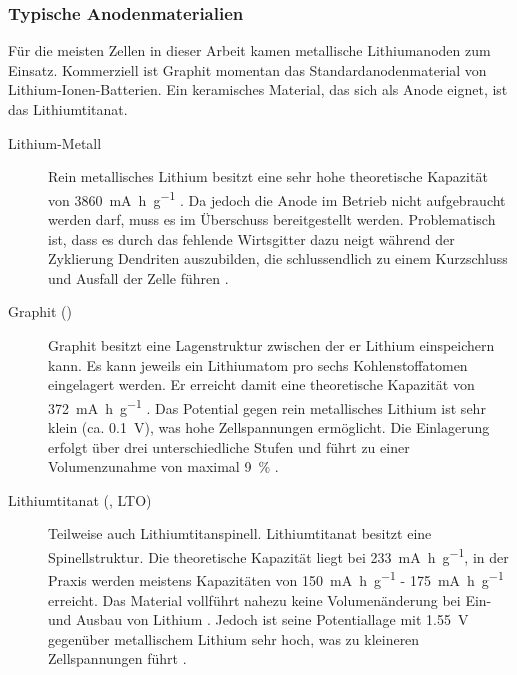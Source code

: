 \documentclass[a4paper, 11pt, headsepline,footsepline,twoside,abstract]{scrbook}
\begin{document}
\subsubsection{Typische Anodenmaterialien}
Für die meisten Zellen in dieser Arbeit kamen metallische Lithiumanoden zum Einsatz. Kommerziell ist Graphit momentan das Standardanodenmaterial von Lithium-Ionen-Batterien. Ein keramisches Material, das sich als Anode eignet, ist das Lithiumtitanat.
\begin{description}
\item[Lithium-Metall] Rein metallisches Lithium besitzt eine sehr hohe theoretische Kapazität von \SI{3860}{\milli\ampere\hour\per\gram} \cite{jossen_2006}. Da jedoch die Anode im Betrieb nicht aufgebraucht werden darf, muss es im Überschuss bereitgestellt werden. Problematisch ist, dass es durch das fehlende Wirtsgitter dazu neigt während der Zyklierung Dendriten auszubilden, die schlussendlich zu einem Kurzschluss und Ausfall der Zelle führen \cite{aurbach2002short}. 
\item[Graphit ()] Graphit besitzt eine Lagenstruktur zwischen der er Lithium einspeichern kann. Es kann jeweils ein Lithiumatom pro sechs Kohlenstoffatomen eingelagert werden. Er erreicht damit eine theoretische Kapazität von \SI{372}{\milli\ampere\hour\per\gram} \cite{delasCasas201274}. Das Potential gegen rein metallisches Lithium ist sehr klein (ca. \SI{0.1}{\volt}), was hohe Zellspannungen ermöglicht. Die Einlagerung erfolgt über drei unterschiedliche Stufen und führt zu einer Volumenzunahme von maximal \SI{9}{\percent} \cite{bub_skript}.
\item[Lithiumtitanat (, LTO)] Teilweise auch Lithiumtitanspinell. Lithiumtitanat besitzt eine Spinellstruktur. Die theoretische Kapazität liegt bei \SI{233}{\milli\ampere\hour\per\gram}, in der Praxis werden meistens Kapazitäten von \SI{150}{\milli\ampere\hour\per\gram} - \SI{175}{\milli\ampere\hour\per\gram} erreicht. Das Material vollführt nahezu keine Volumenänderung bei Ein- und Ausbau von Lithium \cite{huang2007effects}. Jedoch ist seine Potentiallage mit \SI{1.55}{\volt} gegenüber metallischem Lithium sehr hoch, was zu kleineren Zellspannungen führt \cite{hong2010effect}.
\end{description}
\end{document}
